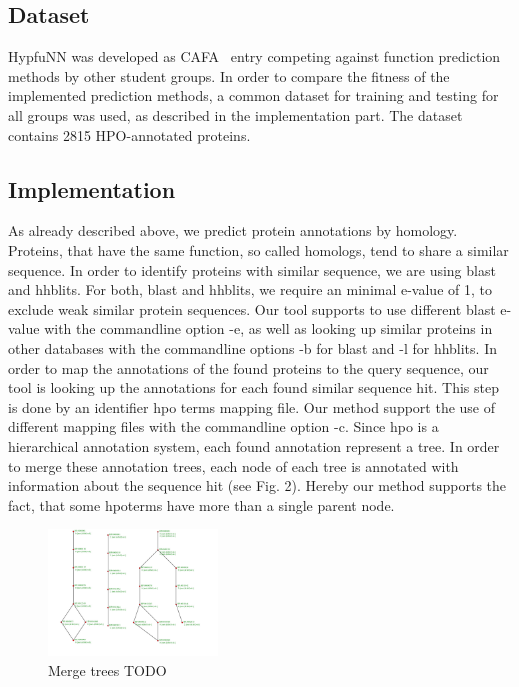 \subsection{Dataset}

HypfuNN was developed as CAFA~\citep{CAFA} entry competing against function prediction methods by other student groups. In order to compare the fitness of the implemented prediction methods, a common
dataset for training and testing for all groups was used, as described in the implementation part. The dataset contains 2815 HPO-annotated proteins.

\subsection{Implementation}

As already described above, we predict protein annotations by homology. Proteins, that have the same function, so called homologs, tend to share a similar sequence. In order to identify proteins
with similar sequence, we are using blast and hhblits. For both, blast and hhblits, we require an minimal e-value of 1, to exclude weak similar protein sequences. Our tool supports to use
different blast e-value with the commandline option -e, as well as looking up similar proteins in other databases with the commandline options -b for blast and -l for hhblits.\newline
In order to map the annotations of the found proteins to the query sequence, our tool is looking up the annotations for each found similar sequence hit. This step is done by an identifier hpo terms mapping
file. Our method support the use of different mapping files with the commandline option -c.\newline
Since hpo is a hierarchical annotation system, each found annotation represent a tree. In order to merge these annotation trees, each node of each tree is annotated with information about the sequence
hit (see Fig. 2). Hereby our method supports the fact, that some hpoterms have more than a single parent node.\newline
\begin{figure}[!hb]
\includegraphics[width = 0.4\textwidth]{figures/merge_trees.png}
\caption{Merge trees TODO}
\label{fig:function_transfer}
\end{figure}
